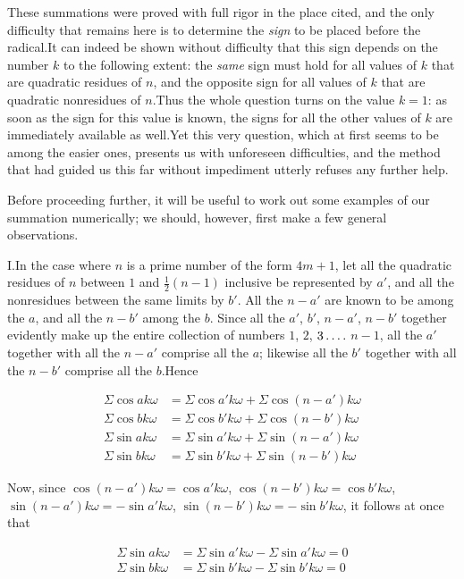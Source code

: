 These summations were proved with full rigor in the place cited, and the only difficulty that remains here is to determine the \emph{sign} to be placed before the radical.\quad It can indeed be shown without difficulty that this sign depends on the number $k$ to the following extent: the \emph{same} sign must hold for all values of $k$ that are quadratic residues of $n$, and the opposite sign for all values of $k$ that are quadratic nonresidues of $n$.\quad Thus the whole question turns on the value $k=1$: as soon as the sign for this value is known, the signs for all the other values of $k$ are immediately available as well.\quad Yet this very question, which at first seems to be among the easier ones, presents us with unforeseen difficulties, and the method that had guided us this far without impediment utterly refuses any further help.


Before proceeding further, it will be useful to work out some examples of our summation numerically; we should, however, first make a few general observations.

I.\quad In the case where $n$ is a prime number of the form $4m+1$, let all the quadratic residues of $n$ between $1$ and $\frac12(n-1)$ inclusive be represented by $a'$, and all the nonresidues between the same limits by $b'$. All the $n-a'$ are known to be among the $a$, and all the $n-b'$ among the $b$. Since all the $a'$, $b'$, $n-a'$, $n-b'$ together evidently make up the entire collection of numbers $1$, $2$, $3\mathinner{.\,.\,.\,.}$ $n-1$, all the $a'$ together with all the $n-a'$ comprise all the $a$; likewise all the $b'$ together with all the $n-b'$ comprise all the $b$.\quad Hence

\[
\begin{aligned}
\Sigma\cos ak\omega&=\Sigma\cos a'k\omega+\Sigma\cos(n-a')k\omega\\
\Sigma\cos bk\omega&=\Sigma\cos b'k\omega+\Sigma\cos(n-b')k\omega\\
\Sigma\sin ak\omega&=\Sigma\sin a'k\omega+\Sigma\sin(n-a')k\omega\\
\Sigma\sin bk\omega&=\Sigma\sin b'k\omega+\Sigma\sin(n-b')k\omega
\end{aligned}
\]

Now, since $\cos(n-a')k\omega=\cos a'k\omega$, $\cos(n-b')k\omega=\cos b'k\omega$, $\sin(n-a')k\omega=-\sin a'k\omega$, $\sin(n-b')k\omega=-\sin b'k\omega$, it follows at once that

\[
\begin{aligned}
\Sigma\sin ak\omega&=\Sigma\sin a'k\omega-\Sigma\sin a'k\omega=0\\
\Sigma\sin bk\omega&=\Sigma\sin b'k\omega-\Sigma\sin b'k\omega=0
\end{aligned}
\]

